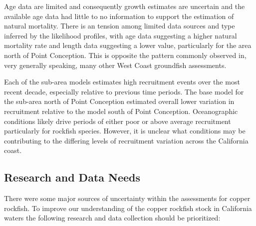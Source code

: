 \documentclass[11pt,
  english,
  letterpaper,
]{article}
\begin{document}
Age data are limited and consequently growth estimates are uncertain and the available age data had little to no information to support the estimation of natural mortality. There is an tension among limited data sources and type inferred by the likelihood profiles, with age data suggesting a higher natural mortality rate and length data suggesting a lower value, particularly for the area north of Point Conception. This is opposite the pattern commonly observed in, very generally speaking, many other West Coast groundfish assessments.

Each of the sub-area models estimates high recruitment events over the most recent decade, especially relative to previous time periods. The base model for the sub-area north of Point Conception estimated overall lower variation in recruitment relative to the model south of Point Conception. Oceanographic conditions likely drive periods of either poor or above average recruitment particularly for rockfish species. However, it is unclear what conditions may be contributing to the differing levels of recruitment variation across the California coast.

\hypertarget{research-and-data-needs-1}{%
\subsection{Research and Data Needs}\label{research-and-data-needs-1}}

There were some major sources of uncertainty within the assessments for copper rockfish. To improve our understanding of the copper rockfish stock in California waters the following research and data collection should be prioritized:
\end{document}

